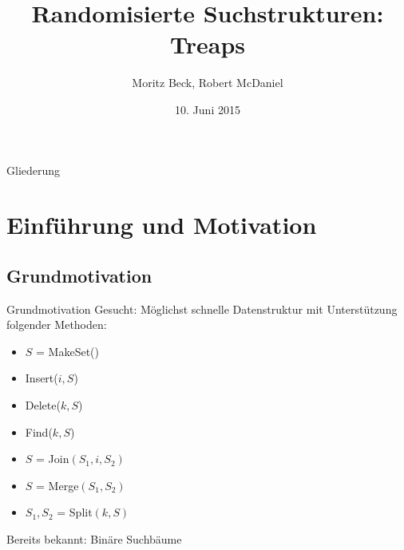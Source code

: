 \documentclass[t]{beamer}
\title[Treaps]{Randomisierte Suchstrukturen: Treaps}
\author[M. Beck, R. McDaniel]{Moritz Beck, Robert McDaniel}
\date[10.06.2015]{10. Juni 2015}
\theoremstyle{plain}
\begin{document}
{

\begin{frame}%
    \titlepage
\end{frame}

\begin{frame}{Gliederung}
    \tableofcontents
\end{frame}
}

\section{Einführung und Motivation}
\subsection{Grundmotivation}
\begin{frame}{Grundmotivation}
    Gesucht: Möglichst schnelle Datenstruktur mit Unterstützung folgender Methoden:
    \bigskip
    \begin{itemize}
        \item<2-> $S$ = MakeSet()
        \item<3-> Insert($i, S$)
        \item<4-> Delete($k, S$)
        \item<5-> Find($k, S$)
        \item<6-> $S$ = Join$(S_1, i, S_2)$
        \item<7-> $S$ = Merge$(S_1, S_2)$
        \item<8-> $S_1, S_2$ = Split$(k, S)$ 
    \end{itemize}
    \bigskip
     Bereits bekannt: Binäre Suchbäume
\end{frame}
\end{document}
